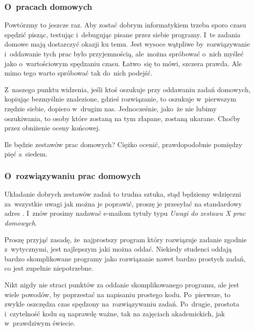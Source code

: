 \documentclass[10pt,t]{beamer}
\begin{document}
\begin{frame}
  \frametitle{O~pracach domowych}


  Powtórzmy to jeszcze raz. Aby zostać dobrym informatykiem trzeba sporo
  czasu spędzić pisząc, testując i~debugując pisane przez siebie programy.
  I~te zadania domowe mają dostarczyć okazji ku temu. Jest wysoce wątpliwe
  by~rozwiązywanie i~oddawanie tych prac było przyjemnością, ale~można
  spróbować o~nich myśleć jako o~wartościowym spędzaniu czasu. Łatwo~się
  to mówi, szczera prawda. Ale mimo tego warto spróbować tak do~nich
  podejść.

  Z~naszego punktu widzenia, jeśli ktoś oszukuje przy oddawaniu zadań
  domowych, kopiując bezmyślnie znalezione, gdzieś rozwiązanie, to oszukuje
  w~pierwszym rzędzie siebie, dopiero w~drugim nas. Jednocześnie, jako~że
  nie lubimy oszukiwania, to osoby które zostaną na tym złapane, zostaną
  ukarane. Choćby przez obniżenie oceny końcowej.

  Ile będzie zestawów prac domowych? Ciężko ocenić, prawdopodobnie pomiędzy
  pięć a~siedem.

\end{frame}





\begin{frame}
  \frametitle{O~rozwiązywaniu prac domowych}


  Układanie dobrych zestawów zadań to trudna sztuka, stąd będziemy
  wdzięczni za~wszystkie uwagi jak można je poprawić, proszę
  je przesyłać na standardowy adres \email. I~znów prosimy nadawać e-mailom
  tytuły typu \textit{Uwagi do zestawu X prac domowych}.


  Proszę przyjąć zasadę, że~\alert{najprostszy program} który rozwiązuje
  zadanie zgodnie z~wytycznymi, jest najlepszym jaki można oddać. Niekiedy
  studenci oddają bardzo skomplikowane programy jako rozwiązanie nawet
  bardzo prostych zadań, co jest zupełnie niepotrzebne.

  Nikt nigdy nie straci punktów za oddanie skomplikowanego programu,
  ale jest wiele powodów, by poprzestać na napisaniu prostego kodu.
  Po~pierwsze, to zwykle oszczędza czas spędzony na~rozwiązywaniu zadań.
  Po~drugie, prostota i~czytelność kodu są naprawdę ważne, tak na zajęciach
  akademickich, jak w~prawdziwym świecie.

\end{frame}
\end{document}
